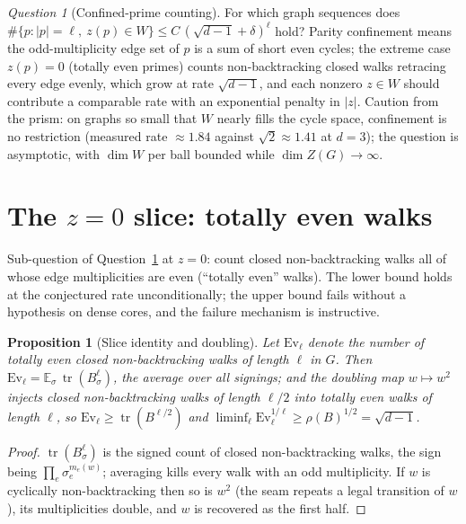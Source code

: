 \documentclass[11pt]{article}
\newtheorem{proposition}[lemma]{Proposition}
\theoremstyle{remark}
\newtheorem{question}[lemma]{Question}
\DeclareMathOperator{\tr}{tr}
\begin{document}
\begin{question}[Confined-prime counting]\label{q:confined}
For which graph sequences does
$\#\{p:|p|=\ell,\ z(p)\in W\}\le C\,(\sqrt{d-1}+\delta)^{\ell}$ hold?
Parity confinement means the odd-multiplicity edge set of $p$ is a sum
of short even cycles; the extreme case $z(p)=0$ (totally even primes)
counts non-backtracking closed walks retracing every edge evenly, which
grow at rate $\sqrt{d-1}$, and each nonzero $z\in W$ should contribute a
comparable rate with an exponential penalty in $|z|$. Caution from the
prism: on graphs so small that $W$ nearly fills the cycle space,
confinement is no restriction (measured rate $\approx1.84$ against
$\sqrt2\approx1.41$ at $d=3$); the question is asymptotic, with
$\dim W$ per ball bounded while $\dim Z(G)\to\infty$.
\end{question}

\section{The $z=0$ slice: totally even walks}\label{sec:even}

Sub-question of Question~\ref{q:confined} at $z=0$: count closed
non-backtracking walks all of whose edge multiplicities are even
(``totally even'' walks). The lower bound holds at the conjectured rate
unconditionally; the upper bound fails without a hypothesis on dense
cores, and the failure mechanism is instructive.

\begin{proposition}[Slice identity and doubling]\label{prop:slice}
Let $\mathrm{Ev}_\ell$ denote the number of totally even closed
non-backtracking walks of length $\ell$ in $G$. Then
$\mathrm{Ev}_\ell=\mathbb E_{\sigma}\,\tr(B_\sigma^{\ell})$, the average
over all signings; and the doubling map $w\mapsto w^2$ injects closed
non-backtracking walks of length $\ell/2$ into totally even walks of
length $\ell$, so
$\mathrm{Ev}_\ell\ge\tr(B^{\ell/2})$ and
$\liminf_\ell \mathrm{Ev}_\ell^{1/\ell}\ge\rho(B)^{1/2}=\sqrt{d-1}$.
\end{proposition}

\begin{proof}
$\tr(B_\sigma^\ell)$ is the signed count of closed non-backtracking
walks, the sign being $\prod_e\sigma_e^{m_e(w)}$; averaging kills every
walk with an odd multiplicity. If $w$ is cyclically non-backtracking
then so is $w^2$ (the seam repeats a legal transition of $w$), its
multiplicities double, and $w$ is recovered as the first half.
\end{proof}
\end{document}
